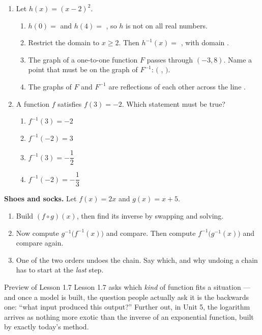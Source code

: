 \documentclass[10pt]{article}
\begin{document}
\begin{enumerate}[itemsep=10pt]
\item Let $h(x) = (x - 2)^2$.

\begin{enumerate}[label=(\alph*), itemsep=5pt]
  \item $h(0) = $ \blank{1.4cm} and $h(4) = $ \blank{1.4cm}, so $h$ is not
        \blank{2.6cm} on all real numbers.
  \item Restrict the domain to $x \ge 2$. Then
        $h^{-1}(x) = $ \blank{3cm}, with domain \blank{2.4cm}.
  \item The graph of a one-to-one function $F$ passes through $(-3, 8)$.
        Name a point that must be on the graph of $F^{-1}$:
        $($ \blank{1.2cm} , \blank{1.2cm} $)$.
  \item The graphs of $F$ and $F^{-1}$ are reflections of each other across the
        line \blank{2cm}.
\end{enumerate}

\item A function $f$ satisfies $f(3) = -2$. Which statement must be true?

\begin{enumerate}[label=\Alph*., itemsep=3pt]
  \item $f^{-1}(3) = -2$
  \item $f^{-1}(-2) = 3$
  \item $f^{-1}(3) = -\dfrac{1}{2}$
  \item $f^{-1}(-2) = -\dfrac{1}{3}$
\end{enumerate}

\end{enumerate}

\vspace{0.1in}

\boxguard
\begin{extensionbox}
\textbf{Shoes and socks.} Let $f(x) = 2x$ and $g(x) = x + 5$.

\begin{enumerate}[label=(\alph*), itemsep=4pt]
  \item Build $(f \circ g)(x)$, then find its inverse by swapping and solving.
  \item Now compute $g^{-1}\big(f^{-1}(x)\big)$ and compare. Then compute
        $f^{-1}\big(g^{-1}(x)\big)$ and compare again.
  \item One of the two orders undoes the chain. Say which, and why undoing a
        chain has to start at the \textit{last} step.
\end{enumerate}

\vspace{0.05in}
\end{extensionbox}

\vspace{0.1in}

\boxguard[9]
\begin{notesbox}{Preview of Lesson 1.7}
Lesson 1.7 asks which \textit{kind} of function fits a situation --- and once a
model is built, the question people actually ask it is the backwards one:
``what input produced this output?'' Further out, in Unit 5, the logarithm
arrives as nothing more exotic than the inverse of an exponential function,
built by exactly today's method.
\end{notesbox}
\end{document}
